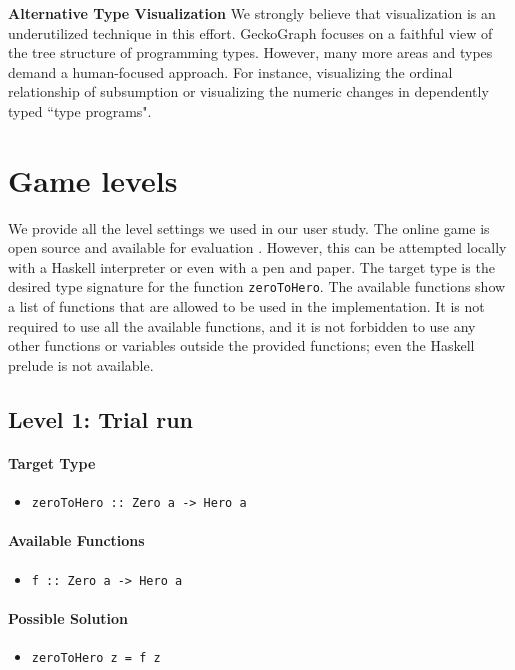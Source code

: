 \documentclass[preprint,12pt]{elsarticle}
\begin{document}
\noindent\textbf{Alternative Type Visualization}
We strongly believe that visualization is an underutilized technique in this effort. GeckoGraph focuses on a faithful view of the tree structure of programming types. However, many more areas and types demand a human-focused approach. For instance, visualizing the ordinal relationship of subsumption or visualizing the numeric changes in dependently typed ``type programs". 

 


\appendix
\section{Game levels} \label{levels}
We provide all the level settings we used in our user study. The online game is open source and available for evaluation \cite{Anonymous_undated-ne}. However, this can be attempted locally with a Haskell interpreter or even with a pen and paper. The target type is the desired type signature for the function \texttt{zeroToHero}. The available functions show a list of functions that are allowed to be used in the implementation. It is not required to use all the available functions, and it is not forbidden to use any other functions or variables outside the provided functions; even the Haskell prelude is not available. 


\subsection{Level 1: Trial run}

\paragraph{Target Type } 
\begin{itemize}
    \item \texttt{zeroToHero :: Zero a -> Hero a}
\end{itemize}

\paragraph{Available Functions} 
\begin{itemize}
    \item \texttt{f :: Zero a -> Hero a}
\end{itemize}

\paragraph{Possible Solution} 
\begin{itemize}
    \item \texttt{zeroToHero z = f z}
\end{itemize}
\end{document}
